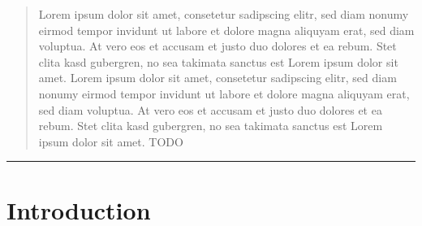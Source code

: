 \documentclass[12pt,a4paper]{article}
\begin{document}
\begin{abstract}
	\noindent Lorem ipsum dolor sit amet, consetetur sadipscing elitr, sed diam nonumy eirmod tempor invidunt ut labore et dolore magna aliquyam erat, sed diam voluptua. At vero eos et accusam et justo duo dolores et ea rebum. Stet clita kasd gubergren, no sea takimata sanctus est Lorem ipsum dolor sit amet. Lorem ipsum dolor sit amet, consetetur sadipscing elitr, sed diam nonumy eirmod tempor invidunt ut labore et dolore magna aliquyam erat, sed diam voluptua. At vero eos et accusam et justo duo dolores et ea rebum. Stet clita kasd gubergren, no sea takimata sanctus est Lorem ipsum dolor sit amet. TODO
\end{abstract}
{\color{RedViolet}\dotfill}

{\color{RedViolet} \rule{\textwidth}{1pt}}


\newpage


\setcounter{page}{1}



\begin{spacing}{0.95}
		
	\tableofcontents
	
\end{spacing}






\newpage


\setcounter{page}{1} 
%

%
%
%
%
%
%
%
%
\newpage
\section{Introduction} \label{section:introduction}
\end{document}
